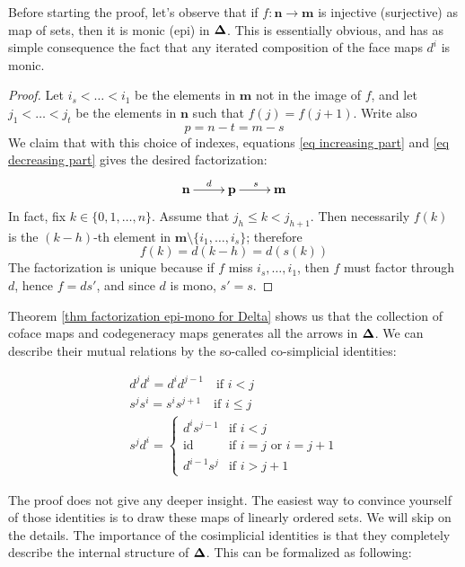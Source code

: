 \begin{refsection}
\begin{rmk}
Before starting the proof, let's observe that if $f \colon \mathbf n \to \mathbf m$ is injective (surjective) as map of sets, then it is monic (epi) in $\mathbf \Delta$. This is essentially obvious, and has as simple consequence the fact that any iterated composition of the face maps $d^i$ is monic.
\end{rmk}

\begin{proof}
Let $i_s < \ldots < i_1$ be the elements in $\mathbf m$ not in the image of $f$, and let $j_1 < \ldots < j_t$ be the elements in $\mathbf n$ such that $f(j) = f(j+1)$. Write also
\[
p = n -t = m - s
\]
We claim that with this choice of indexes, equations \eqref{eq increasing part} and \eqref{eq decreasing part} gives the desired factorization:
\[
\xymatrix{ \mathbf n \ar[r]^d & \mathbf p \ar[r]^s & \mathbf m }
\]
In fact, fix $k \in \{0,1,\ldots,n\}$. Assume that $j_h \le k < j_{h+1}$. Then necessarily $f(k)$ is the $(k-h)$-th element in $\mathbf m \setminus \{i_1,\ldots,i_s\}$; therefore
\[
f(k) = d(k-h) = d(s(k))
\]
The factorization is unique because if $f$ miss $i_s,\ldots,i_1$, then $f$ must factor through $d$, hence $f = d s'$, and since $d$ is mono, $s' = s$.
\end{proof}

Theorem \ref{thm factorization epi-mono for Delta} shows us that the collection of coface maps and codegeneracy maps generates all the arrows in $\mathbf \Delta$. We can describe their mutual relations by the so-called co-simplicial identities:

\begin{equation} \label{eq cosimplicial identities}
\begin{gathered}
d^j d^i = d^i d^{j-1} \quad \text{if } i < j \\
s^j s^i = s^i s^{j+1} \quad \text{if } i \le j \\
s^j d^i = \begin{cases} d^i s^{j-1} & \text{if } i < j \\
\text{id} & \text{if } i = j \text{ or } i = j + 1 \\
d^{i-1} s^j & \text{if } i > j+1 \end{cases}
\end{gathered}
\end{equation}

The proof does not give any deeper insight. The easiest way to convince yourself of those identities is to draw these maps of linearly ordered sets. We will skip on the details. The importance of the cosimplicial identities is that they completely describe the internal structure of $\mathbf \Delta$. This can be formalized as following:


\end{refsection}
